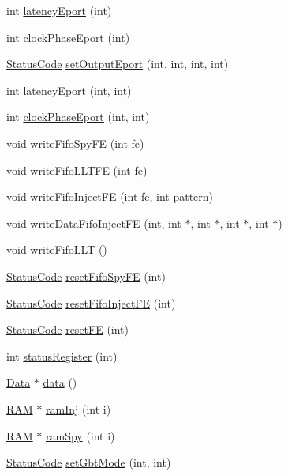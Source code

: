 \begin{DoxyCompactItemize}
\item 
int \hyperlink{classFEB__v1_a330c0a895c3c43acda2fd68e1cdb7368}{latencyEport} (int)
\item 
int \hyperlink{classFEB__v1_a4a5b20275b96a19eba0c28d694c88ca8}{clockPhaseEport} (int)
\item 
\hyperlink{classStatusCode}{StatusCode} \hyperlink{classFEB__v1_ae8ed47630ca1408647e3eb5c1dfa0ec0}{setOutputEport} (int, int, int, int)
\item 
int \hyperlink{classFEB__v1_a8ab1ff429d357779d682bdf28504bdd2}{latencyEport} (int, int)
\item 
int \hyperlink{classFEB__v1_aab32d0b274dfb55f1c2894ff3d08eaba}{clockPhaseEport} (int, int)
\item 
void \hyperlink{classFEB__v1_a0fd77cbaae9ae853e5c4dfc81b4462a5}{writeFifoSpyFE} (int fe)
\item 
void \hyperlink{classFEB__v1_a9dbedaebc2e3569e8b5fc0be782dbce3}{writeFifoLLTFE} (int fe)
\item 
void \hyperlink{classFEB__v1_ae212b0e4c9824afaebb4508b688f94bf}{writeFifoInjectFE} (int fe, int pattern)
\item 
void \hyperlink{classFEB__v1_a0afafcfdea15d3268284203a90c67572}{writeDataFifoInjectFE} (int, int $\ast$, int $\ast$, int $\ast$, int $\ast$)
\item 
void \hyperlink{classFEB__v1_a0e88b14453100c97b5962e8a6b0f48bf}{writeFifoLLT} ()
\item 
\hyperlink{classStatusCode}{StatusCode} \hyperlink{classFEB__v1_ab02c292e29e01079bb9b268acbc782b1}{resetFifoSpyFE} (int)
\item 
\hyperlink{classStatusCode}{StatusCode} \hyperlink{classFEB__v1_a71d10a772bda2506fd7adb86739fb24d}{resetFifoInjectFE} (int)
\item 
\hyperlink{classStatusCode}{StatusCode} \hyperlink{classFEB__v1_ae351e55f3d8e8f936c324ffbda6816bf}{resetFE} (int)
\item 
int \hyperlink{classFEB__v1_aa98b8e0bcc4d6d03f4b365de786f5c95}{statusRegister} (int)
\item 
\hyperlink{classData}{Data} $\ast$ \hyperlink{classFEB__v1_a6bca4320bd3bbbc32efc81097f33421a}{data} ()
\item 
\hyperlink{classRAM}{RAM} $\ast$ \hyperlink{classFEB__v1_aceff066f476794fefe2712e43bc2d6d2}{ramInj} (int i)
\item 
\hyperlink{classRAM}{RAM} $\ast$ \hyperlink{classFEB__v1_ac59216f094007ede67d49bd23287be73}{ramSpy} (int i)
\item 
\hyperlink{classStatusCode}{StatusCode} \hyperlink{classFEB__v1_a849040ff2fa8275b1a47e7be3915ebf4}{setGbtMode} (int, int)

\end{DoxyCompactItemize}

